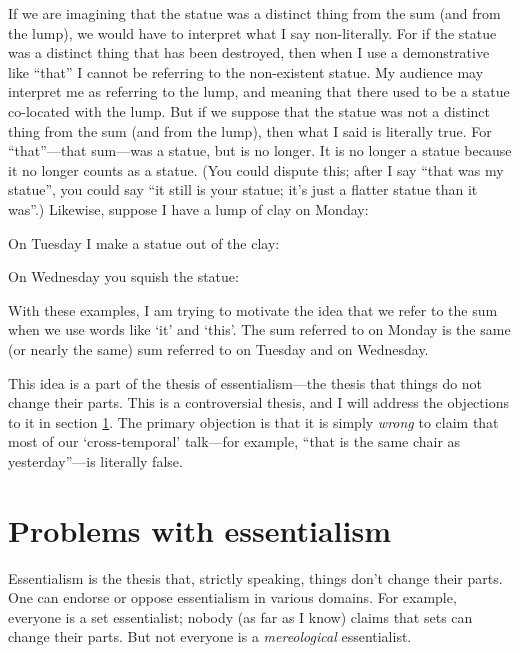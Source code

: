 \documentclass[11pt]{article}
\begin{document}
\begin{spacing}{1.5}
\begin{enumerate}
    If we are imagining that the statue was a distinct thing from the
    sum (and from the lump), we would have to interpret what I say
    non-literally.  For if the statue was a distinct thing that has
    been destroyed, then when I use a demonstrative like ``that'' I
    cannot be referring to the non-existent statue.  My audience may
    interpret me as referring to the lump, and meaning that there used
    to be a statue co-located with the lump.  But if we suppose that
    the statue was not a distinct thing from the sum (and from the
    lump), then what I said is literally true.  For ``that''---that
    sum---was a statue, but is no longer.  It is no longer a statue
    because it no longer counts as a statue.  (You could dispute this;
    after I say ``that was my statue'', you could say ``it still is
    your statue; it's just a flatter statue than it was''.)  Likewise,
    suppose I have a lump of clay on Monday:


    On Tuesday I make a statue out of the clay:


    On Wednesday you squish the statue:

\end{enumerate}

With these examples, I am trying to motivate the idea that we refer to
the sum when we use words like `it' and `this'.  The sum referred to
on Monday is the same (or nearly the same) sum referred to on Tuesday
and on Wednesday.

This idea is a part of the thesis of essentialism---the thesis that
things do not change their parts.  This is a controversial thesis, and
I will address the objections to it in section \ref{essentialism}.
The primary objection is that it is simply {\em wrong} to claim that
most of our `cross-temporal' talk---for example, ``that is the same
chair as yesterday''---is literally false.

\section{Problems with essentialism}
\label{essentialism}
Essentialism is the thesis that, strictly speaking, things don't
change their parts.  One can endorse or oppose essentialism in various
domains.  For example, everyone is a set essentialist; nobody (as far
as I know) claims that sets can change their parts.  But not everyone
is a {\em mereological} essentialist.


\end{spacing}
\end{document}
